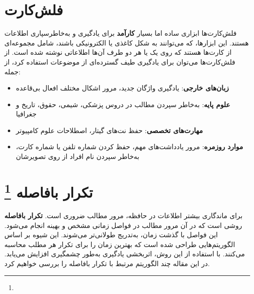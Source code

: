 \documentclass[12pt]{report}
\begin{document}
\section{فلش‌کارت}
فلش‌کارت‌ها ابزاری ساده اما بسیار 
\textbf{کارآمد}
برای یادگیری و به‌خاطرسپاری اطلاعات هستند. این ابزارها، که می‌توانند به شکل 
کاغذی یا الکترونیکی باشند، شامل مجموعه‌ای از کارت‌ها هستند
 که روی یک یا هر دو طرف آن‌ها اطلاعاتی نوشته شده است. از فلش‌کارت‌ها 
می‌توان برای یادگیری طیف گسترده‌ای از موضوعات استفاده کرد، از جمله:

\begin{itemize}
  \item \textbf{زبان‌های خارجی}: یادگیری واژگان جدید، مرور اشکال مختلف افعال بی‌قاعده
  \item \textbf{علوم پایه}: به‌خاطر سپردن مطالب در دروس پزشکی، شیمی، حقوق، تاریخ و جغرافیا
  \item \textbf{مهارت‌های تخصصی}: حفظ نت‌های گیتار، اصطلاحات علوم کامپیوتر
  \item \textbf{موارد روزمره}: مرور یادداشت‌های مهم، حفظ کردن شماره تلفن یا شماره کارت، به‌خاطر سپردن نام افراد از روی تصویرشان
\end{itemize}

\section{تکرار بافاصله
\protect\footnote{}
}

برای ماندگاری بیشتر اطلاعات در حافظه، مرور مطالب ضروری است.
\textbf{تکرار بافاصله}
 روشی است که در آن مرور مطالب در فواصل زمانی مشخص و بهینه انجام می‌شود.
  این فواصل با گذشت زمان،
  به‌تدریج طولانی‌تر می‌شوند. 
 این شیوه بر اساس الگوریتم‌هایی 
 طراحی شده است که بهترین زمان را
  برای تکرار هر مطلب محاسبه می‌کنند. 
 با استفاده از این روش، اثربخشی
  یادگیری به‌طور چشمگیری افزایش می‌یابد. 
 در این مقاله چند الگوریتم مرتبط
  با تکرار بافاصله را 
 بررسی خواهیم کرد.

\end{document}
